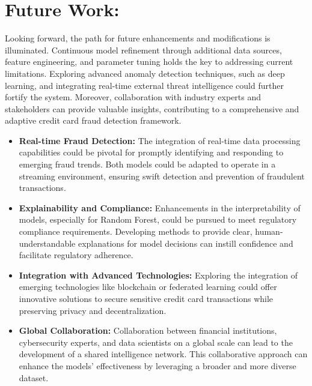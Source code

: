 \section{Future Work:}
Looking forward, the path for future enhancements and modifications is illuminated. Continuous model refinement through additional data sources, feature engineering, and parameter tuning holds the key to addressing current limitations. Exploring advanced anomaly detection techniques, such as deep learning, and integrating real-time external threat intelligence could further fortify the system. Moreover, collaboration with industry experts and stakeholders can provide valuable insights, contributing to a comprehensive and adaptive credit card fraud detection framework.
\begin{itemize}
\item \textbf{Real-time Fraud Detection:} The integration of real-time data processing capabilities could be pivotal for promptly identifying and responding to emerging fraud trends. Both models could be adapted to operate in a streaming environment, ensuring swift detection and prevention of fraudulent transactions.
\item \textbf{Explainability and Compliance:} Enhancements in the interpretability of models, especially for Random Forest, could be pursued to meet regulatory compliance requirements. Developing methods to provide clear, human-understandable explanations for model decisions can instill confidence and facilitate regulatory adherence.    
\item \textbf{Integration with Advanced Technologies:} Exploring the integration of emerging technologies like blockchain or federated learning could offer innovative solutions to secure sensitive credit card transactions while preserving privacy and decentralization.    

\item \textbf{Global Collaboration:} Collaboration between financial institutions, cybersecurity experts, and data scientists on a global scale can lead to the development of a shared intelligence network. This collaborative approach can enhance the models' effectiveness by leveraging a broader and more diverse dataset.                                                      

\end{itemize}
